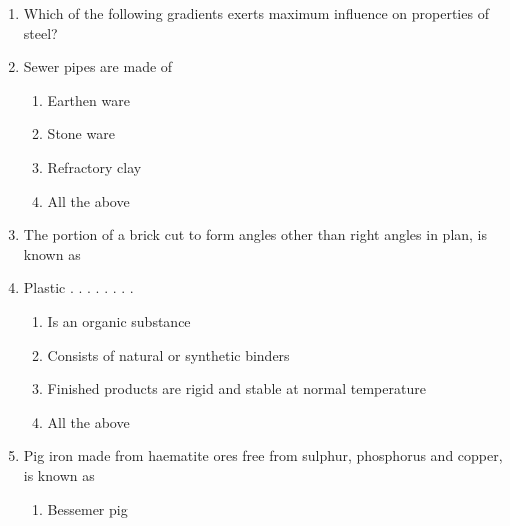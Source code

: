 \documentclass[11pt,a4paper]{article}
\begin{document}
\begin{enumerate}
\item{Which of the following gradients exerts maximum influence on properties of steel?}
\\
\item{Sewer pipes are made of}
\begin{enumerate}[label=\Alph*.]
\item{Earthen ware}
\item{Stone ware}
\item{Refractory clay}
\item{All the above}
\end{enumerate}
\item{The portion of a brick cut to form angles other than right angles in plan, is known as}
\\
\item{Plastic . . . . . . . .}
\begin{enumerate}[label=\Alph*.]
\item{Is an organic substance}
\item{Consists of natural or synthetic binders}
\item{Finished products are rigid and stable at normal temperature}
\item{All the above}
\end{enumerate}
\item{Pig iron made from haematite ores free from sulphur, phosphorus and copper, is known as}
\begin{enumerate}[label=\Alph*.]
\item{Bessemer pig}

\end{enumerate}
\end{enumerate}
\end{document}
